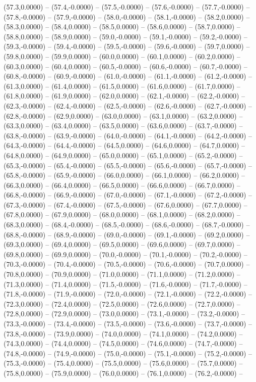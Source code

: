 \documentclass{SVnote}
\begin{document}
(57.3,0.0000) -- (57.4,-0.0000) -- (57.5,-0.0000) -- (57.6,-0.0000) -- (57.7,-0.0000) -- (57.8,-0.0000) -- (57.9,-0.0000) -- (58.0,-0.0000) -- (58.1,-0.0000) -- (58.2,0.0000) -- (58.3,0.0000) -- (58.4,0.0000) -- (58.5,0.0000) -- (58.6,0.0000) -- (58.7,0.0000) -- (58.8,0.0000) -- (58.9,0.0000) -- (59.0,-0.0000) -- (59.1,-0.0000) -- (59.2,-0.0000) -- (59.3,-0.0000) -- (59.4,-0.0000) -- (59.5,-0.0000) -- (59.6,-0.0000) -- (59.7,0.0000) -- (59.8,0.0000) -- (59.9,0.0000) -- (60.0,0.0000) -- (60.1,0.0000) -- (60.2,0.0000) -- (60.3,0.0000) -- (60.4,0.0000) -- (60.5,-0.0000) -- (60.6,-0.0000) -- (60.7,-0.0000) -- (60.8,-0.0000) -- (60.9,-0.0000) -- (61.0,-0.0000) -- (61.1,-0.0000) -- (61.2,-0.0000) -- (61.3,0.0000) -- (61.4,0.0000) -- (61.5,0.0000) -- (61.6,0.0000) -- (61.7,0.0000) -- (61.8,0.0000) -- (61.9,0.0000) -- (62.0,0.0000) -- (62.1,-0.0000) -- (62.2,-0.0000) -- (62.3,-0.0000) -- (62.4,-0.0000) -- (62.5,-0.0000) -- (62.6,-0.0000) -- (62.7,-0.0000) -- (62.8,-0.0000) -- (62.9,0.0000) -- (63.0,0.0000) -- (63.1,0.0000) -- (63.2,0.0000) -- (63.3,0.0000) -- (63.4,0.0000) -- (63.5,0.0000) -- (63.6,0.0000) -- (63.7,-0.0000) -- (63.8,-0.0000) -- (63.9,-0.0000) -- (64.0,-0.0000) -- (64.1,-0.0000) -- (64.2,-0.0000) -- (64.3,-0.0000) -- (64.4,-0.0000) -- (64.5,0.0000) -- (64.6,0.0000) -- (64.7,0.0000) -- (64.8,0.0000) -- (64.9,0.0000) -- (65.0,0.0000) -- (65.1,0.0000) -- (65.2,-0.0000) -- (65.3,-0.0000) -- (65.4,-0.0000) -- (65.5,-0.0000) -- (65.6,-0.0000) -- (65.7,-0.0000) -- (65.8,-0.0000) -- (65.9,-0.0000) -- (66.0,0.0000) -- (66.1,0.0000) -- (66.2,0.0000) -- (66.3,0.0000) -- (66.4,0.0000) -- (66.5,0.0000) -- (66.6,0.0000) -- (66.7,0.0000) -- (66.8,-0.0000) -- (66.9,-0.0000) -- (67.0,-0.0000) -- (67.1,-0.0000) -- (67.2,-0.0000) -- (67.3,-0.0000) -- (67.4,-0.0000) -- (67.5,-0.0000) -- (67.6,0.0000) -- (67.7,0.0000) -- (67.8,0.0000) -- (67.9,0.0000) -- (68.0,0.0000) -- (68.1,0.0000) -- (68.2,0.0000) -- (68.3,0.0000) -- (68.4,-0.0000) -- (68.5,-0.0000) -- (68.6,-0.0000) -- (68.7,-0.0000) -- (68.8,-0.0000) -- (68.9,-0.0000) -- (69.0,-0.0000) -- (69.1,-0.0000) -- (69.2,0.0000) -- (69.3,0.0000) -- (69.4,0.0000) -- (69.5,0.0000) -- (69.6,0.0000) -- (69.7,0.0000) -- (69.8,0.0000) -- (69.9,0.0000) -- (70.0,-0.0000) -- (70.1,-0.0000) -- (70.2,-0.0000) -- (70.3,-0.0000) -- (70.4,-0.0000) -- (70.5,-0.0000) -- (70.6,-0.0000) -- (70.7,0.0000) -- (70.8,0.0000) -- (70.9,0.0000) -- (71.0,0.0000) -- (71.1,0.0000) -- (71.2,0.0000) -- (71.3,0.0000) -- (71.4,0.0000) -- (71.5,-0.0000) -- (71.6,-0.0000) -- (71.7,-0.0000) -- (71.8,-0.0000) -- (71.9,-0.0000) -- (72.0,-0.0000) -- (72.1,-0.0000) -- (72.2,-0.0000) -- (72.3,0.0000) -- (72.4,0.0000) -- (72.5,0.0000) -- (72.6,0.0000) -- (72.7,0.0000) -- (72.8,0.0000) -- (72.9,0.0000) -- (73.0,0.0000) -- (73.1,-0.0000) -- (73.2,-0.0000) -- (73.3,-0.0000) -- (73.4,-0.0000) -- (73.5,-0.0000) -- (73.6,-0.0000) -- (73.7,-0.0000) -- (73.8,-0.0000) -- (73.9,0.0000) -- (74.0,0.0000) -- (74.1,0.0000) -- (74.2,0.0000) -- (74.3,0.0000) -- (74.4,0.0000) -- (74.5,0.0000) -- (74.6,0.0000) -- (74.7,-0.0000) -- (74.8,-0.0000) -- (74.9,-0.0000) -- (75.0,-0.0000) -- (75.1,-0.0000) -- (75.2,-0.0000) -- (75.3,-0.0000) -- (75.4,0.0000) -- (75.5,0.0000) -- (75.6,0.0000) -- (75.7,0.0000) -- (75.8,0.0000) -- (75.9,0.0000) -- (76.0,0.0000) -- (76.1,0.0000) -- (76.2,-0.0000) -- 
\end{document}
